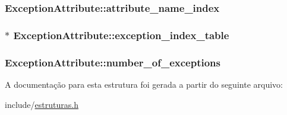 \subsubsection[{\texorpdfstring{attribute\+\_\+name\+\_\+index}{attribute_name_index}}]{ Exception\+Attribute\+::attribute\+\_\+name\+\_\+index}\hypertarget{struct_exception_attribute_a0d10afce4ebfc218924ec98121e2a37f}{}\label{struct_exception_attribute_a0d10afce4ebfc218924ec98121e2a37f}
\subsubsection[{\texorpdfstring{exception\+\_\+index\+\_\+table}{exception_index_table}}]{$\ast$ Exception\+Attribute\+::exception\+\_\+index\+\_\+table}\hypertarget{struct_exception_attribute_aa1607cc18ce94ce03891d766a380d041}{}\label{struct_exception_attribute_aa1607cc18ce94ce03891d766a380d041}
\subsubsection[{\texorpdfstring{number\+\_\+of\+\_\+exceptions}{number_of_exceptions}}]{ Exception\+Attribute\+::number\+\_\+of\+\_\+exceptions}\hypertarget{struct_exception_attribute_a389b17447aa3278771d0649f1df66e69}{}\label{struct_exception_attribute_a389b17447aa3278771d0649f1df66e69}


A documentação para esta estrutura foi gerada a partir do seguinte arquivo\+:\begin{DoxyCompactItemize}
\item 
include/\hyperlink{estruturas_8h}{estruturas.\+h}\end{DoxyCompactItemize}
